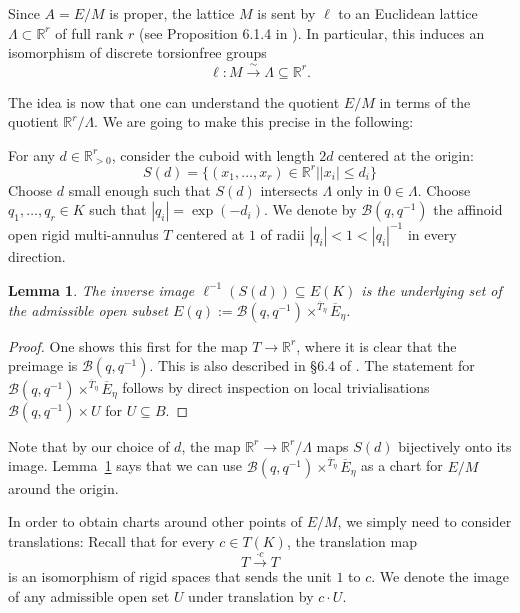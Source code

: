 \documentclass[10pt,oneside]{amsart}
\newtheorem{lemma}[theorem]{Lemma}
\theoremstyle{definition}
\theoremstyle{remark}
\begin{document}
	Since $A=E/M$ is proper, the lattice $M$ is sent by $\ell$ to an Euclidean lattice $\Lambda \subset \mathbb R^r$ of full rank $r$ (see Proposition 6.1.4 in \cite{rigid geometry of curves}). In particular, this induces an isomorphism of discrete torsionfree groups
	\[\ell:M\xrightarrow{\sim} \Lambda\subseteq\mathbb R^r.\]
	
	The idea is now that one can understand the quotient $E/M$ in terms of the quotient $\mathbb R^r/\Lambda$. We are going to make this precise in the following:
	
	For any $d\in \mathbb R_{> 0}^r$, consider the cuboid with length $2d$ centered at the origin:
	\[S(d) = \{(x_1,\dots,x_r)\in \mathbb R^r | |x_i|\leq d_i \}\]
	Choose $d$ small enough such that $S(d)$ intersects $\Lambda$ only in $0\in \Lambda$. Choose
	 $q_1,\dots,q_r\in K$ such that $|q_i|=\exp(-d_i)$. We denote by $\mathcal B(q,q^{-1})$ the affinoid open rigid multi-annulus $T$ centered at $1$ of radii $|q_i|< 1 < |q_i|^{-1}$ in every direction.
	
	\begin{lemma}\label{cube around origin gives local chart for E/M}
		The inverse image $\ell^{-1}(S(d))\subseteq E(K)$ is the underlying set of the admissible open subset $E(q):=\mathcal B(q,q^{-1})\times^{\overline{T}_\eta}\overline{E}_\eta$.
	\end{lemma}
	\begin{proof}
		One shows this first for the map $T\rightarrow \mathbb R^r$, where it is clear that the preimage is $\mathcal B(q,q^{-1})$. This is also described in \S 6.4 of \cite{FvdP}. The statement for $\mathcal B(q,q^{-1})\times^{\overline{T}_\eta}\overline{E}_\eta$ follows by direct inspection on local trivialisations $\mathcal B(q,q^{-1})\times U$ for $U\subseteq B$.
	\end{proof}
	
	
	Note that by our choice of $d$, the map $\mathbb R^r\rightarrow \mathbb R^r/\Lambda$ maps $S(d)$ bijectively onto its image. 
	Lemma~\ref{cube around origin gives local chart for E/M} says that we can use $\mathcal B(q,q^{-1})\times^{\overline{T}_\eta}\overline{E}_\eta$ as a chart for $E/M$ around the origin.
	
	In order to obtain charts around other points of $E/M$, we simply need to consider translations: Recall that for every $c\in T(K)$, the translation map
	\[T\xrightarrow{\cdot c}T\]
	is an isomorphism of rigid spaces that sends the unit $1$ to $c$. We denote the image of any admissible open set $U$ under translation by $c\cdot U$.
	
\end{document}
